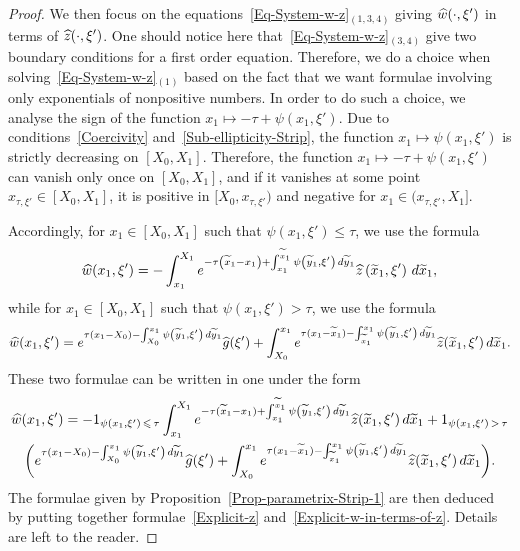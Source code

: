 \documentclass[10pt]{amsart}
\theoremstyle{definition}\newtheorem{defi}[theo]{Definition}\newtheorem{rema}[theo]{Remark}\newtheorem{exam}[theo]{Example}\newtheorem{exem}[theo]{Example}\newtheorem{nota}[theo]{Notation}
\renewcommand{\leq}{\leqslant}
\renewcommand{\tilde}{\widetilde}
\renewcommand{\hat}{\widehat}
\let\oldtilde\tilde
\renewcommand*{\tilde}[1]{\mathchoice{\widetilde{#1}}{\widetilde{#1}}{\oldtilde{#1}}{\oldtilde{#1}}}
\let\oldhat\hat
\renewcommand*{\hat}[1]{\mathchoice{\widehat{#1}}{\widehat{#1}}{\oldhat{#1}}{\oldhat{#1}}}
\begin{document}
\begin{proof}
We then focus on the equations~\eqref{Eq-System-w-z}$_{(1,3,4)}$ giving $\hat w(\cdot, \xi')$ in terms of $\hat z(\cdot, \xi')$. One should notice here that~\eqref{Eq-System-w-z}$_{(3,4)}$ give two boundary conditions for a first order equation. Therefore, we do a choice when solving~\eqref{Eq-System-w-z}$_{(1)}$ based on the fact that we want formulae involving only exponentials of nonpositive numbers. In order to do such a choice, we analyse the sign of the function $ x_1 \mapsto - \tau + \psi(x_1, \xi') $. Due to conditions~\eqref{Coercivity} and~\eqref{Sub-ellipticity-Strip}, the function $x_1 \mapsto \psi(x_1, \xi')$ is strictly decreasing on $[X_0, X_1]$. Therefore, the function $ x_1 \mapsto - \tau + \psi(x_1, \xi') $ can vanish only once on $[X_0, X_1]$, and if it vanishes at some point $x_{\tau,\xi'} \in [X_0,X_1]$, it is positive in $[X_0, x_{\tau,\xi'})$ and negative for $x_1 \in (x_{\tau,\xi'}, X_1]$.

Accordingly, for $x_1 \in [X_0, X_1]$ such that $\psi(x_1, \xi') \leq \tau$, we use the formula
\begin{equation*}
\widehat{w}(x_1, \xi') = -\int_{x_1}^{X_1} e^{-\tau\left(\tilde{x}_1-x_1\right)+\int_{x_1}^{\tilde{x}_1} \psi\left(\tilde{y}_1,\xi'\right) \, d \tilde{y}_1} \widehat{z}\left(\tilde{x}_1, \xi'\right) \, d \tilde{x}_1,
\end{equation*}
while for $x_1 \in [X_0, X_1]$ such that $\psi(x_1, \xi') >\tau$, we use the formula
\begin{equation*}
\widehat{w}(x_1, \xi') = e^{\tau(x_1-X_0)- \int_{X_0}^{x_1} \psi\left(\tilde{y}_1, \xi'\right) \, d \tilde{y}_1 } \widehat{g}(\xi') +
\int_{X_0}^{x_1} e^{\tau(x_1-\tilde{x}_1) - \int_{\tilde{x}_1}^{x_1} \psi\left(\tilde{y}_1,\xi'\right) \, d \tilde{y}_1} \widehat{z}(\tilde{x}_1, \xi') \, d \tilde{x}_1.
\end{equation*}
These two formulae can be written in one under the form
\begin{multline}\label{Explicit-w-in-terms-of-z}
\hat w(x_1, \xi') = - 1_{\psi(x_1, \xi')\, \leq \,\tau} \int_{x_1}^{X_1} e^{-\tau(\tilde{x}_1-x_1)+\int_{x_1}^{\tilde{x}_1} \psi\left(\tilde{y}_1,\xi'\right) \, d \tilde{y}_1} \widehat{z}(\tilde{x}_1, \xi') \, d \tilde{x}_1
+ 1_{\psi(x_1,\xi')\, >\,\tau}
\\
 \left(e^{\tau(x_1-X_0)- \int_{X_0}^{x_1} \psi\left(\tilde{y}_1, \xi'\right) \, d \tilde{y}_1 } \widehat{g}(\xi') +
\int_{X_0}^{x_1} e^{\tau(x_1-\tilde{x}_1) - \int_{\tilde{x}_1}^{x_1} \psi\left(\tilde{y}_1,\xi'\right) \, d \tilde{y}_1} \widehat{z}(\tilde{x}_1, \xi') \, d \tilde{x}_1 \right)\!.
\end{multline}
The formulae given by Proposition~\ref{Prop-parametrix-Strip-1} are then deduced by putting together formulae~\eqref{Explicit-z} and~\eqref{Explicit-w-in-terms-of-z}. Details are left to the reader.
\end{proof}
\end{document}

